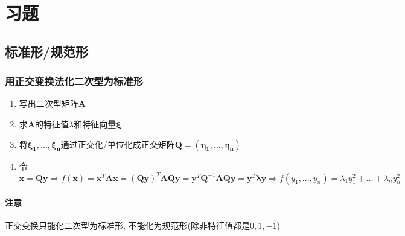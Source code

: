 \section{习题}
\subsection{标准形/规范形}
\subsubsection{用正交变换法化二次型为标准形}
\begin{enumerate}\label{ref:求标准形}
	\item 写出二次型矩阵$ \bm{A} $
	\item 求$ \bm{A} $的特征值$ \lambda $和特征向量$ \bm{\xi} $
	\item 将$ \bm{\xi_{1}},..., \bm{\xi_{n}} $通过正交化/单位化成正交矩阵$ \bm{Q}=(\bm{\eta_{1}},..., \bm{\eta_{n}}) $
	\item 令$ \bm{x}=\bm{Q}\bm{y}\Rightarrow f(\bm{x})=\bm{x}^{T}\bm{A}\bm{x}=(\bm{Q}\bm{y})^{T}\bm{A}\bm{Q}\bm{y}=\bm{y}^{T}\bm{Q}^{-1}\bm{A}\bm{Q}\bm{y}=\bm{y}^{T}\bm{\lambda}\bm{y}\Rightarrow f(y_{1},..., y_{n})=\lambda_{1}y_{1}^{2}+... +\lambda_{n}y_{n}^{2} $ 
\end{enumerate}
\paragraph{注意} 正交变换只能化二次型为标准形, 不能化为规范形(除非特征值都是$ 0, 1, -1 $)